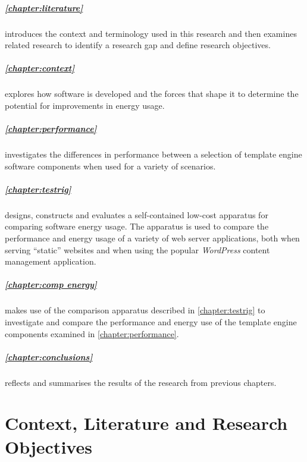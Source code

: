 \paragraph{\autoref{chapter:literature}} introduces the context and terminology used in this research and then examines related research to identify a research gap and define research objectives.

\paragraph{\autoref{chapter:context}} explores how software is developed and the forces that shape it to determine the potential for improvements in energy usage.

\paragraph{\autoref{chapter:performance}} investigates the differences in performance between a selection of \gls{template engine} software components when used for a variety of scenarios.

\paragraph{\autoref{chapter:testrig}} designs, constructs and evaluates a self-contained low-cost apparatus for comparing software energy usage. The apparatus is used to compare the performance and energy usage of a variety of web server applications, both when serving \enquote{static} websites and when using the popular \emph{WordPress} content management application.

\paragraph{\autoref{chapter:comp energy}} makes use of the comparison apparatus described in \autoref{chapter:testrig} to investigate and compare the performance and energy use of the \gls{template engine} components examined in \autoref{chapter:performance}.

\paragraph{\autoref{chapter:conclusions}} reflects and summarises the results of the research from previous chapters.



\chapter{Context, Literature and Research Objectives}
\label{chapter:literature}

